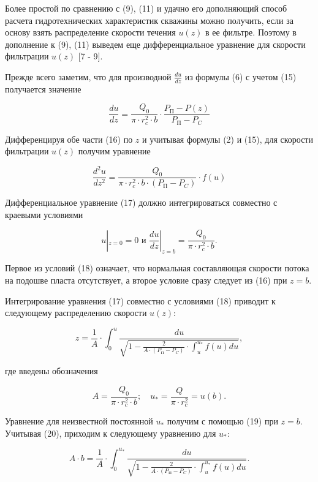 \begin{multicols}{2}
Более простой по сравнению с (9), (11) и удачно его дополняющий способ
расчета гидротехнических характеристик скважины можно получить, если за
основу взять распределение скорости течения $u(z)$ в ее фильтре.
Поэтому в дополнение к (9), (11) выведем еще дифференциальное уравнение
для скорости фильтрации $u(z)$ {[}7 - 9{]}.

Прежде всего заметим, что для производной $\frac{du}{dz}$ из формулы
(6) с учетом (15) получается значение

\begin{equation}
\frac{du}{dz}=\frac{Q_0}{\pi\cdot r_c^2\cdot b}\cdot\frac{P_{\text{П}}-P(z)}{P_{\text{П}}-P_C}
\end{equation}

Дифференцируя обе части (16) по $z$ и учитывая формулы (2) и (15),
для скорости фильтрации $u(z)$ получим уравнение

\begin{equation}
\frac{d^2u}{dz^2}=\frac{Q_0}{\pi\cdot r_c^2\cdot b\cdot(P_{\text{П}}-P_C)}\cdot f(u)
\end{equation}

Дифференциальное уравнение (17) должно интегрироваться совместно с
краевыми условиями

\begin{equation}
u|_{z=0}=0\text{ и }\frac{du}{dz}|_{z=b}=\frac{Q_0}{\pi\cdot r_c^2\cdot b}.
\end{equation}

Первое из условий (18) означает, что нормальная составляющая скорости
потока на подошве пласта отсутствует, а второе условие сразу следует из
(16) при $z=b$.

Интегрирование уравнения (17) совместно с условиями (18) приводит к
следующему распределению скорости $u(z)$:

\begin{equation}
z=\frac{1}{A}\cdot\int_0^u\frac{du}{\sqrt{1-\frac{2}{A\cdot(P_{\text{П}}-P_C)}\cdot\int_u^{u_*}f(u)du}},
\end{equation}

где введены обозначения

\begin{equation}
A=\frac{Q_0}{\pi\cdot r_c^2\cdot b};\quad u_*=\frac{Q}{\pi\cdot r_c^2}=u(b).
\end{equation}

Уравнение для неизвестной постоянной $u_*$ получим с
помощью (19) при $z=b$. Учитывая (20), приходим к следующему
уравнению для $u_*$:

\begin{equation}
A\cdot b=\frac{1}{A}\cdot\int_0^{u_*}\frac{du}{\sqrt{1-\frac{2}{A\cdot(P_{\text{П}}-P_C)}\cdot\int_u^{u_*}f(u)du}}.
\end{equation}


\end{multicols}

